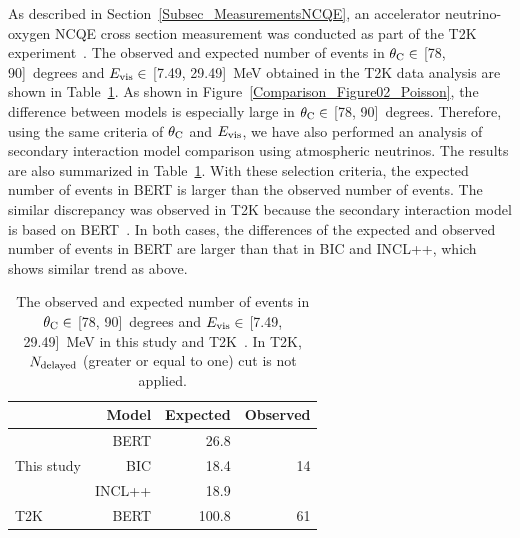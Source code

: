 \hs
As described in Section~\ref{Subsec_MeasurementsNCQE}, an accelerator neutrino-oxygen NCQE cross section measurement was conducted as part of the T2K experiment~\cite{2019Abe}.
The observed and expected number of events in $\theta_{\rm C}\in$ [78, 90]~degrees and $E_{\rm vis}\in$ [7.49, 29.49]~MeV obtained in the T2K data analysis are shown in Table~\ref{tab:obsexp}.
As shown in Figure~\ref{Comparison_Figure02_Poisson}, the difference between models is especially large in $\theta_{\rm C}\in$ [78, 90]~degrees.
Therefore, using the same criteria of $\theta_{\rm C}$ and $E_{\rm vis}$, we have also performed an analysis of secondary interaction model comparison using atmospheric neutrinos.
The results are also summarized in Table~\ref{tab:obsexp}.
With these selection criteria, the expected number of events in BERT is larger than the observed number of events.
The similar discrepancy was observed in T2K because the secondary interaction model is based on BERT~\cite{2019Abe,1970Coleman}.
In both cases, the differences of the expected and observed number of events in BERT are larger than that in BIC and INCL++, which shows similar trend as above.

\begin{table}[h]
	\centering
	\caption[The observed and expected number of events in $\theta_{\rm C}\in$ , 90\rbrack~degrees and $E_{\rm vis}\in$ , 29.49\rbrack~MeV in this study and T2K]{
	The observed and expected number of events in $\theta_{\rm C}\in$ [78, 90]~degrees and $E_{\rm vis}\in$ [7.49, 29.49]~MeV in this study and T2K~\cite{2019Abe}.
	In T2K, $N_{\rm delayed}$ (greater or equal to one) cut is not applied.
	}\label{tab:obsexp}
	\vs
	\begin{tabular}{lrrr} \hline \hline
		           & Model  & Expected & Observed \\ \hline
		           & BERT   & 26.8     &          \\
		This study & BIC    & 18.4     & 14       \\
		           & INCL++ & 18.9     &          \\ \hline
		T2K        & BERT   & 100.8    & 61       \\ \hline \hline
	\end{tabular}
\end{table}





\newpage

